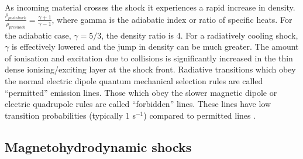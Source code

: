 As incoming material crosses the shock it experiences a rapid increase in density.
$ \frac{\rho_{postshock}}{\rho_{preshock}} = \frac{\gamma +1}{\gamma -1}$,
where gamma is the adiabatic index or ratio of specific heats.
For the adiabatic case, $\gamma = 5/3$, the density ratio is 4.
For a radiatively cooling shock, $\gamma$ is effectively lowered and the jump in density can be much  greater.
The amount of ionisation and excitation due to collisions is significantly increased in the thin dense ionising/exciting layer at the shock front.
Radiative transitions which obey the normal electric dipole quantum mechanical selection rules are called ``permitted'' emission lines.
Those which obey the slower magnetic dipole or electric quadrupole rules are called ``forbidden'' lines.
These lines have low transition probabilities (typically 1 s$^{-1}$) compared to
permitted lines \citep[(typically 10$^8$ s$^{-1}$)][]{1980pim..book.....D}. 


\subsection{Magnetohydrodynamic shocks}

